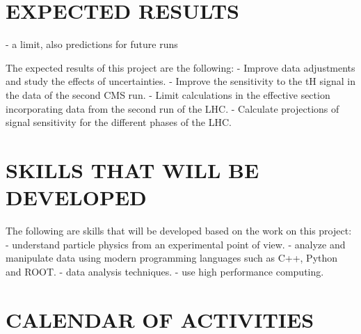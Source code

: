 \documentclass[final,3p]{CSP}
\begin{document}
\section{EXPECTED RESULTS}
- a limit, also predictions for future runs

The expected results of this project are the following:
- Improve data adjustments and study the effects of uncertainties.
- Improve the sensitivity to the tH signal in the data of the second CMS run.
- Limit calculations in the effective section incorporating data from the second run of the LHC.
- Calculate projections of signal sensitivity for the different phases of the LHC.



\section{SKILLS THAT WILL BE DEVELOPED}
The following are skills that will be developed based on the work on this project:
- understand particle physics from an experimental point of view.
- analyze and manipulate data using modern programming languages such as C++, Python and ROOT.
- data analysis techniques.
- use high performance computing.

\section{CALENDAR OF ACTIVITIES}



\cleardoublepage

\end{document}

